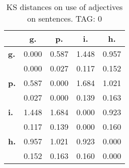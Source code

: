 \begin{table}[h!]
\begin{center}
\begin{tabular}{| l || c | c | c | c |}\hline
 & {\bf g.} & {\bf p.} & {\bf i.} & {\bf h.} \\\hline\hline
{\bf g.} & 0.000 & 0.587 & 1.448 & 0.957 \\
{\bf } & 0.000 & 0.027 & 0.117 & 0.152 \\\hline
{\bf p.} & 0.587 & 0.000 & 1.684 & 1.021 \\
{\bf } & 0.027 & 0.000 & 0.139 & 0.163 \\\hline
{\bf i.} & 1.448 & 1.684 & 0.000 & 0.923 \\
{\bf } & 0.117 & 0.139 & 0.000 & 0.160 \\\hline
{\bf h.} & 0.957 & 1.021 & 0.923 & 0.000 \\
{\bf } & 0.152 & 0.163 & 0.160 & 0.000 \\\hline
\end{tabular}
\caption{KS distances on use of adjectives on sentences. TAG: 0}
\end{center}
\end{table}